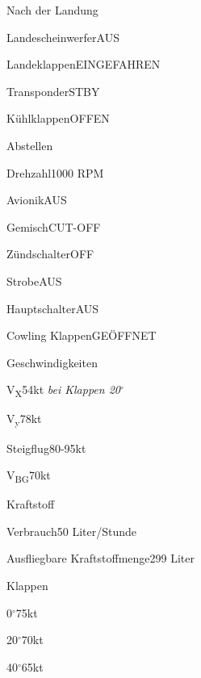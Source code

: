  \begin{checklist}{Nach der Landung}
    \item{Landescheinwerfer}{AUS}
    \item{Landeklappen}{EINGEFAHREN}
    \item{Transponder}{STBY}
    \item{Kühlklappen}{OFFEN}
  \end{checklist}

  \begin{checklist}{Abstellen}
    \item{Drehzahl}{1000 RPM}
    \item{Avionik}{AUS}
    \item{Gemisch}{CUT-OFF}
    \item{Zündschalter}{OFF}
    \item{Strobe}{AUS}
    \item{Hauptschalter}{AUS}
    \item{Cowling Klappen}{GEÖFFNET}
  \end{checklist}

  \begin{checklist}{Geschwindigkeiten}
    \item{V\textsubscript{X}}{54kt \textit{bei Klappen 20$^{\circ}$}}
    \item{V\textsubscript{y}}{78kt}
    \item{Steigflug}{80-95kt}
    \item{V\textsubscript{BG}}{70kt}
  \end{checklist}
  \begin{checklist}{Kraftstoff}
    \item{Verbrauch}{50 Liter/Stunde}
    \item{Ausfliegbare Kraftstoffmenge}{299 Liter}
  \end{checklist}
  \begin{checklist}{Klappen}
    \item{0$^{\circ}$}{75kt}
    \item{20$^{\circ}$}{70kt}
    \item{40$^{\circ}$}{65kt}
  \end{checklist}
